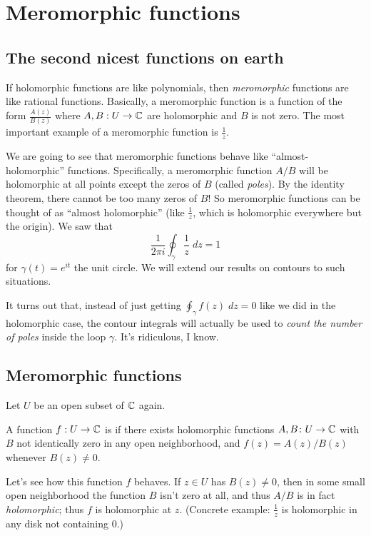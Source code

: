 \chapter{Meromorphic functions}
\section{The second nicest functions on earth}
If holomorphic functions are like polynomials,
then \emph{meromorphic} functions are like rational functions.
Basically, a meromorphic function is a function of the form
$ \frac{A(z)}{B(z)} $
where $A , B:  U \to \mathbb C$ are holomorphic and $B$ is not zero.
The most important example of a meromorphic function is $\frac 1z$.

We are going to see that meromorphic functions behave
like ``almost-holomorphic'' functions.
Specifically, a meromorphic function $A/B$ will be holomorphic at all points
except the zeros of $B$ (called \emph{poles}).
By the identity theorem, there cannot be too many zeros of $B$!
So meromorphic functions can be thought of as ``almost holomorphic''
(like $\frac 1z$, which is holomorphic everywhere but the origin).
We saw that
\[ \frac{1}{2\pi i} \oint_{\gamma} \frac 1z \; dz =  1 \]
for $\gamma(t) = e^{it}$ the unit circle.
We will extend our results on contours to such situations.

It turns out that, instead of just getting $\oint_\gamma f(z) \; dz = 0$
like we did in the holomorphic case,
the contour integrals will actually be used to
\emph{count the number of poles} inside the loop $\gamma$.
It's ridiculous, I know.

\section{Meromorphic functions}

Let $U$ be an open subset of $\mathbb C$ again.
\begin{definition}
	A function $f : U \to \mathbb C$ is 
	if there exists holomorphic functions $A, B \colon U \to \mathbb C$
	with $B$ not identically zero in any open neighborhood,
	and $f(z) = A(z)/B(z)$ whenever $B(z) \ne 0$.
\end{definition}
Let's see how this function $f$ behaves.
If $z \in U$ has $B(z) \neq 0$,
then in some small open neighborhood the function $B$ isn't zero
at all, and thus $A/B$ is in fact \emph{holomorphic};
thus $f$ is holomorphic at $z$.
(Concrete example: $\frac 1z$ is holomorphic
in any disk not containing $0$.)


